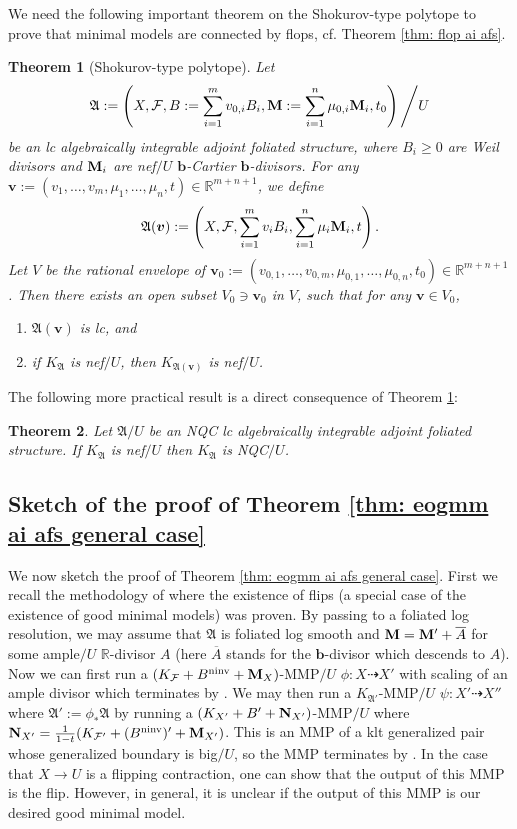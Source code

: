 \documentclass[12pt]{amsart}
\numberwithin{equation}{section}
\newcommand{\bb}{\bm{b}}
\newcommand{\Mm}{{\bf{M}}}
\newcommand{\Nn}{{\bf{N}}}
\newcommand{\Rr}{\mathbb{R}}
\newcommand{\ninv}{\operatorname{ninv}}
\newcommand{\Aa}{{\mathfrak{A}}}
\newcommand{\Ff}{\mathcal{F}}
\newtheorem{thmsub}{Theorem}[subsection]
\theoremstyle{definition}
\theoremstyle{definition}
\theoremstyle{definition}
\begin{document}
We need the following important theorem on the Shokurov-type polytope to prove that minimal models are connected by flops, cf. Theorem \ref{thm: flop ai afs}.

\begin{thmsub}[Shokurov-type polytope]\label{thm: shokurov type polytope}
Let 
$$\Aa:=\left(X,\Ff,B:=\sum_{i=1}^mv_{0,i}B_i,\Mm:=\sum_{i=1}^n\mu_{0,i}\Mm_i,t_0\right)\Bigg/U$$
be an lc algebraically integrable adjoint foliated structure, where $B_i\geq 0$ are Weil divisors and $\Mm_i$ are nef$/U$ $\bb$-Cartier $\bb$-divisors. For any $\bm{v}:=(v_1,\dots,v_m,\mu_1,\dots,\mu_n,t)\in\mathbb R^{m+n+1}$, we define $$\Aa(\bm{v}):=\left(X,\Ff,\sum_{i=1}^mv_{i}B_i,\sum_{i=1}^n\mu_{i}\Mm_i,t\right).$$
Let $V$ be the rational envelope of $\bm{v}_0:=(v_{0,1},\dots,v_{0,m},\mu_{0,1},\dots,\mu_{0,n},t_0)\in\mathbb R^{m+n+1}$. Then there exists an open subset $V_0\ni\bm{v}_0$ in $V$, such that for any $\bm{v}\in V_0$,
\begin{enumerate}
    \item  $\Aa(\bm{v})$ is lc, and
    \item if $K_{\Aa}$ is nef$/U$, then $K_{\Aa(\bm{v})}$ is nef$/U$.
\end{enumerate}
\end{thmsub}
The following more practical result is a direct consequence of Theorem \ref{thm: shokurov type polytope}:

\begin{thmsub}\label{thm: nqc of ka}
    Let $\Aa/U$ be an NQC lc algebraically integrable adjoint foliated structure. If $K_{\Aa}$ is nef$/U$ then $K_{\Aa}$ is NQC$/U$. 
\end{thmsub}



\subsection{Sketch of the proof of Theorem \ref{thm: eogmm ai afs general case}}\label{sec: proof sketch}
We now sketch the proof of Theorem \ref{thm: eogmm ai afs general case}.
First we recall the methodology of \cite{CHLMSSX24} where the existence of flips (a special case of the existence of good minimal models) was proven. By passing to a foliated log resolution, we may assume that $\Aa$ is foliated log smooth and $\Mm=\Mm'+\overline{A}$ for some ample$/U$ $\Rr$-divisor $A$ (here $\overline{A}$ stands for the $\bb$-divisor which descends to $A$). Now we can first run a $(K_{\Ff}+B^{\ninv}+\Mm_X)$-MMP$/U$ $\phi: X\dashrightarrow X'$ with scaling of an ample divisor which terminates by \cite[Theorem 1.5]{LMX24}.  We may then run a $K_{\Aa'}$-MMP$/U$ $\psi: X'\dashrightarrow X''$ where $\Aa':=\phi_*\Aa$ by running a $(K_{X'}+B'+\Nn_{X'})$-MMP$/U$ where $\Nn_{X'}= \frac{1}{1-t}(K_{\mathcal F'}+(B^{\ninv})'+\Mm_{X'})$. This is an MMP of a klt generalized pair whose generalized boundary is big$/U$, so the MMP terminates by \cite[Lemma 4.4]{BZ16}. In the case that $X \to U$ is a flipping contraction, one can show that the output of this MMP is the flip.  However, in general, it is unclear if the output of this MMP is our desired good minimal model.  
\end{document}
